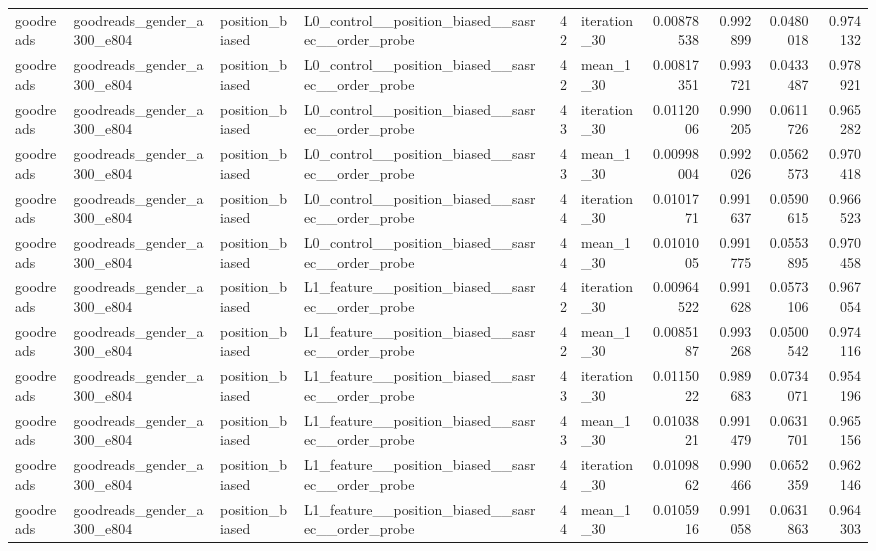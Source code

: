 \begin{table}[htbp!]
\begin{tabular}{llllrlrrrr}
goodreads & goodreads\_gender\_a300\_e804 & position\_biased & L0\_control\_\_position\_biased\_\_sasrec\_\_order\_probe & 42 & iteration\_30 & 0.00878538 & 0.992899 & 0.0480018 & 0.974132 \\
goodreads & goodreads\_gender\_a300\_e804 & position\_biased & L0\_control\_\_position\_biased\_\_sasrec\_\_order\_probe & 42 & mean\_1\_30 & 0.00817351 & 0.993721 & 0.0433487 & 0.978921 \\
goodreads & goodreads\_gender\_a300\_e804 & position\_biased & L0\_control\_\_position\_biased\_\_sasrec\_\_order\_probe & 43 & iteration\_30 & 0.0112006 & 0.990205 & 0.0611726 & 0.965282 \\
goodreads & goodreads\_gender\_a300\_e804 & position\_biased & L0\_control\_\_position\_biased\_\_sasrec\_\_order\_probe & 43 & mean\_1\_30 & 0.00998004 & 0.992026 & 0.0562573 & 0.970418 \\
goodreads & goodreads\_gender\_a300\_e804 & position\_biased & L0\_control\_\_position\_biased\_\_sasrec\_\_order\_probe & 44 & iteration\_30 & 0.0101771 & 0.991637 & 0.0590615 & 0.966523 \\
goodreads & goodreads\_gender\_a300\_e804 & position\_biased & L0\_control\_\_position\_biased\_\_sasrec\_\_order\_probe & 44 & mean\_1\_30 & 0.0101005 & 0.991775 & 0.0553895 & 0.970458 \\
goodreads & goodreads\_gender\_a300\_e804 & position\_biased & L1\_feature\_\_position\_biased\_\_sasrec\_\_order\_probe & 42 & iteration\_30 & 0.00964522 & 0.991628 & 0.0573106 & 0.967054 \\
goodreads & goodreads\_gender\_a300\_e804 & position\_biased & L1\_feature\_\_position\_biased\_\_sasrec\_\_order\_probe & 42 & mean\_1\_30 & 0.0085187 & 0.993268 & 0.0500542 & 0.974116 \\
goodreads & goodreads\_gender\_a300\_e804 & position\_biased & L1\_feature\_\_position\_biased\_\_sasrec\_\_order\_probe & 43 & iteration\_30 & 0.0115022 & 0.989683 & 0.0734071 & 0.954196 \\
goodreads & goodreads\_gender\_a300\_e804 & position\_biased & L1\_feature\_\_position\_biased\_\_sasrec\_\_order\_probe & 43 & mean\_1\_30 & 0.0103821 & 0.991479 & 0.0631701 & 0.965156 \\
goodreads & goodreads\_gender\_a300\_e804 & position\_biased & L1\_feature\_\_position\_biased\_\_sasrec\_\_order\_probe & 44 & iteration\_30 & 0.0109862 & 0.990466 & 0.0652359 & 0.962146 \\
goodreads & goodreads\_gender\_a300\_e804 & position\_biased & L1\_feature\_\_position\_biased\_\_sasrec\_\_order\_probe & 44 & mean\_1\_30 & 0.0105916 & 0.991058 & 0.0631863 & 0.964303 \\

\end{tabular}
\end{table}
